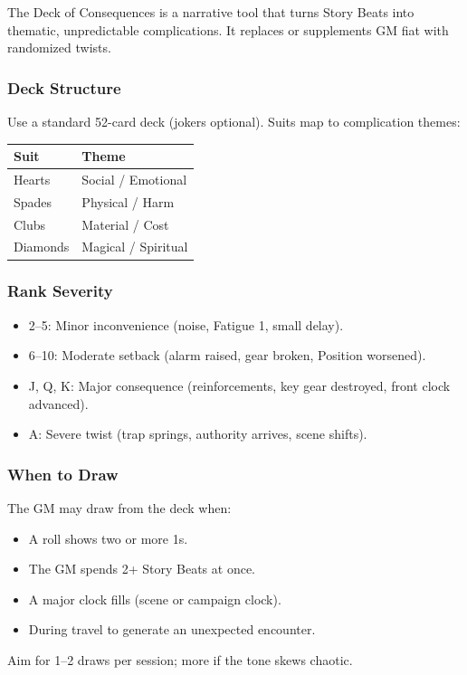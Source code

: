 The Deck of Consequences is a narrative tool that turns Story Beats into thematic, unpredictable complications. It replaces or supplements GM fiat with randomized twists.

\subsubsection{Deck Structure}
Use a standard 52-card deck (jokers optional). Suits map to complication themes:

\begin{tabular}{@{}ll@{}}
\toprule
\textbf{Suit} & \textbf{Theme} \\
\midrule
Hearts   & Social / Emotional \\
Spades   & Physical / Harm \\
Clubs    & Material / Cost \\
Diamonds & Magical / Spiritual \\
\bottomrule
\end{tabular}

\subsubsection{Rank Severity}
\begin{itemize}
  \item 2–5: Minor inconvenience (noise, Fatigue 1, small delay).
  \item 6–10: Moderate setback (alarm raised, gear broken, Position worsened).
  \item J, Q, K: Major consequence (reinforcements, key gear destroyed, front clock advanced).
  \item A: Severe twist (trap springs, authority arrives, scene shifts).
\end{itemize}

\subsubsection{When to Draw}
The GM may draw from the deck when:
\begin{itemize}
  \item A roll shows two or more 1s.
  \item The GM spends 2+ Story Beats at once.
  \item A major clock fills (scene or campaign clock).
  \item During travel to generate an unexpected encounter.
\end{itemize}
Aim for 1–2 draws per session; more if the tone skews chaotic.

